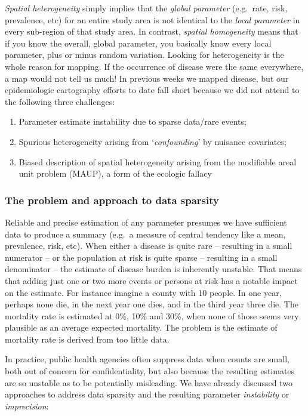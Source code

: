 \documentclass[
]{book}
\providecommand{\tightlist}{%
  \setlength{\itemsep}{0pt}\setlength{\parskip}{0pt}}
\begin{document}
\emph{Spatial heterogeneity} simply implies that the \emph{global parameter} (e.g.~rate, risk, prevalence, etc) for an entire study area is not identical to the \emph{local parameter} in every sub-region of that study area. In contrast, \emph{spatial homogeneity} means that if you know the overall, global parameter, you basically know every local parameter, plus or minus random variation. Looking for heterogeneity is the whole reason for mapping. If the occurrence of disease were the same everywhere, a map would not tell us much! In previous weeks we mapped disease, but our epidemiologic cartography efforts to date fall short because we did not attend to the following three challenges:

\begin{enumerate}
\def\labelenumi{\arabic{enumi}.}
\tightlist
\item
  Parameter estimate instability due to sparse data/rare events;
\item
  Spurious heterogeneity arising from `\emph{confounding}' by nuisance covariates;
\item
  Biased description of spatial heterogeneity arising from the modifiable areal unit problem (MAUP), a form of the ecologic fallacy
\end{enumerate}

\hypertarget{the-problem-and-approach-to-data-sparsity}{%
\subsubsection{The problem and approach to data sparsity}\label{the-problem-and-approach-to-data-sparsity}}

Reliable and precise estimation of any parameter presumes we have sufficient data to produce a summary (e.g.~a measure of central tendency like a mean, prevalence, risk, etc). When either a disease is quite rare -- resulting in a small numerator -- or the population at risk is quite sparse -- resulting in a small denominator -- the estimate of disease burden is inherently unstable. That means that adding just one or two more events or persons at risk has a notable impact on the estimate. For instance imagine a county with 10 people. In one year, perhaps none die, in the next year one dies, and in the third year three die. The mortality rate is estimated at 0\%, 10\% and 30\%, when none of those seems very plausible as an average expected mortality. The problem is the estimate of mortality rate is derived from too little data.

In practice, public health agencies often suppress data when counts are small, both out of concern for confidentiality, but also because the resulting estimates are so unstable as to be potentially misleading. We have already discussed two approaches to address data sparsity and the resulting parameter \emph{instability} or \emph{imprecision}:
\end{document}

